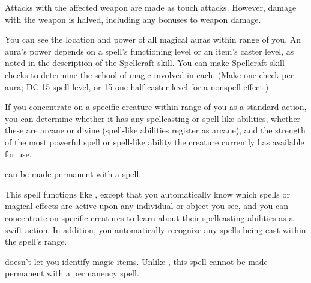 \spellrng{\rngclose}
\begin{spelleffect}
  Attacks with the affected weapon are made as touch attacks. However, damage with the weapon is halved, including any bonuses to weapon damage.
\end{spelleffect}

\spellrng{\rngpers}
\begin{spelleffect}
  You can see the location and power of all magical auras within \rngmed range of you. An aura's power depends on a spell's functioning level or an item's caster level, as noted in the description of the Spellcraft skill. You can make Spellcraft skill checks to determine the school of magic involved in each. (Make one check per aura; DC 15 \add spell level, or 15 \add one-half caster level for a nonspell effect.)
  \par If you concentrate on a specific creature within \rngmed range of you as a standard action, you can determine whether it has any spellcasting or spell-like abilities, whether these are arcane or divine (spell-like abilities register as arcane), and the strength of the most powerful spell or spell-like ability the creature currently has available for use.
\end{spelleffect}
\begin{spellnotes}
   can be made permanent with a  spell.
\end{spellnotes}

\begin{spelleffect}
  This spell functions like , except that you automatically know which spells or magical effects are active upon any individual or object you see, and you can concentrate on specific creatures to learn about their spellcasting abilities as a swift action. In addition, you automatically recognize any spells being cast within the spell's range.
\end{spelleffect}
\begin{spellnotes}
  \par {} doesn't let you identify magic items. Unlike , this spell cannot be made permanent with a permanency spell.
\end{spellnotes}

